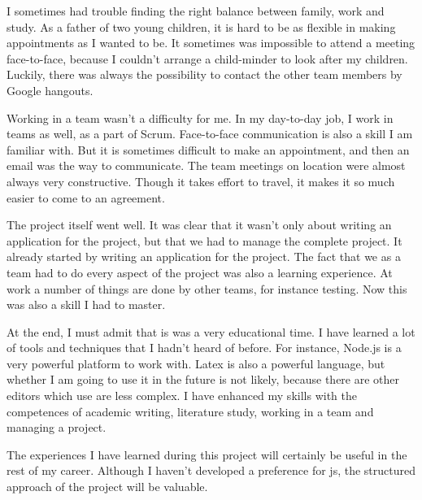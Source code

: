 I sometimes had trouble finding the right balance between family, work and study.
As a father of two young children, it is hard to be as flexible in making
appointments as I wanted to be.
It sometimes was impossible to attend a meeting face-to-face, because I couldn't
arrange a child-minder to look after my children.
Luckily, there was always the possibility to contact the other team members by
Google hangouts.

Working in a team wasn't a difficulty for me. In my day-to-day job, I work in
teams as well, as a part of Scrum. Face-to-face communication is also a skill I
am familiar with.
But it is sometimes difficult to make an appointment, and then an email was the
way to communicate. 
The team meetings on location were almost always very constructive.
Though it takes effort to travel, it makes it so much easier to come to an
agreement.

The project itself went well.
It was clear that it wasn't only about writing an application for the project,
but that we
had to manage the complete project.
It already started by writing an application for the project.
The fact that we as a team had to do every aspect of the project was also a
learning experience. 
At work a number of things are done by other teams, for instance testing.
Now this was also a skill I had to master.

At the end, I must admit that is was a very educational time. I have learned a 
lot of tools and techniques that I hadn't heard of before.
For instance, Node.js is a very powerful platform to work with.
Latex is also a powerful language, but whether I am going to use it in the future is
not likely, because there are other editors which use are less complex.
I have enhanced my skills with the competences of academic writing, literature
study, working in a team and managing a project.

The experiences I have learned during this project will certainly be useful in
the rest of my career. Although I haven't developed a preference for \gls{js},
the structured approach of the project will be valuable.
